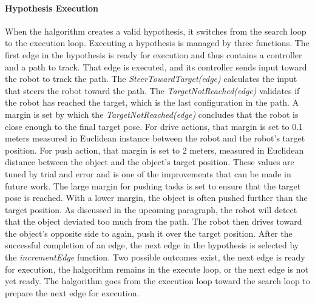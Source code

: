 \paragraph{Hypothesis Execution}
When the \ac{halgorithm} creates a valid hypothesis, it switches from the search loop to the execution loop. Executing a hypothesis is managed by three functions. The first edge in the hypothesis is ready for execution and thus contains a controller and a path to track. That edge is executed, and its controller sends input toward the robot to track the path. The \textit{SteerTowardTarget(\gls{edge})} calculates the input that steers the robot toward the path. The \textit{TargetNotReached(\gls{edge})} validates if the robot has reached the target, which is the last configuration in the path. A margin is set by which the \textit{TargetNotReached(\gls{edge})} concludes that the robot is close enough to the final target pose. For drive actions, that margin is set to 0.1 meters measured in Euclidean instance between the robot and the robot's target position.
For push action, that margin is set to 2 meters, measured in Euclidean distance between the object and the object's target position. These values are tuned by trial and error and is one of the improvements that can be made in future work. The large margin for pushing tasks is set to ensure that the target pose is reached. With a lower margin, the object is often pushed further than the target position. As discussed in the upcoming paragraph, the robot will detect that the object deviated too much from the path. The robot then drives toward the object's opposite side to again, push it over the target position. After the successful completion of an edge, the next edge in the hypothesis is selected by the \textit{incrementEdge} function. Two possible outcomes exist, the next edge is ready for execution, the \ac{halgorithm} remains in the execute loop, or the next edge is not yet ready. The \ac{halgorithm} goes from the execution loop toward the search loop to prepare the next edge for execution.\bs




